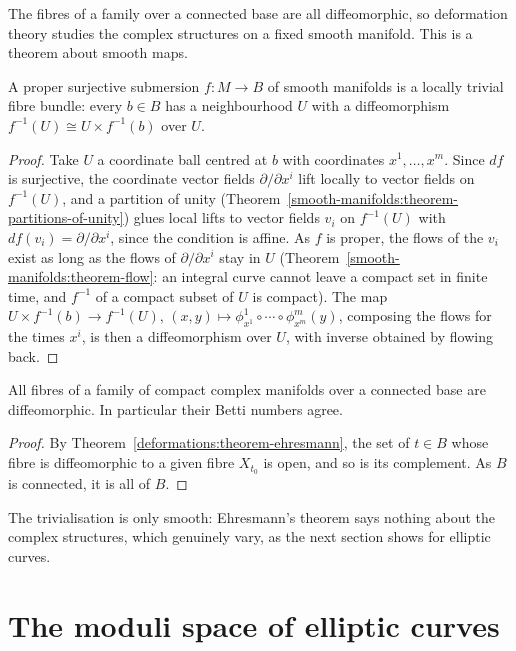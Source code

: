 The fibres of a family over a connected base are all diffeomorphic, so deformation theory studies the complex structures on a fixed smooth manifold. This is a theorem about smooth maps.

\begin{theorem}[Ehresmann]\label{deformations:theorem-ehresmann}
A proper surjective submersion $f \colon M \to B$ of smooth manifolds is a locally trivial fibre bundle: every $b \in B$ has a neighbourhood $U$ with a diffeomorphism
$f^{-1}(U) \cong U \times f^{-1}(b)$ over $U$.
\end{theorem}

\begin{proof}
Take $U$ a coordinate ball centred at $b$ with coordinates $x^1, \ldots, x^m$. Since $df$ is surjective, the coordinate vector fields $\partial/\partial x^i$ lift locally to vector fields on
$f^{-1}(U)$, and a partition of unity (Theorem~\ref{smooth-manifolds:theorem-partitions-of-unity}) glues local lifts to vector fields $v_i$ on $f^{-1}(U)$ with $df(v_i) = \partial/\partial x^i$,
since the condition is affine. As $f$ is proper, the flows of the $v_i$ exist as long as the flows of $\partial/\partial x^i$ stay in $U$
(Theorem~\ref{smooth-manifolds:theorem-flow}: an integral curve cannot leave a compact set in finite time, and $f^{-1}$ of a compact subset of $U$ is compact). The map
$U \times f^{-1}(b) \to f^{-1}(U)$, $(x, y) \mapsto \phi^1_{x^1} \circ \cdots \circ \phi^m_{x^m}(y)$, composing the flows for the times $x^i$, is then a diffeomorphism over $U$, with inverse obtained by
flowing back.
\end{proof}

\begin{corollary}\label{deformations:corollary-fibres-diffeomorphic}
All fibres of a family of compact complex manifolds over a connected base are diffeomorphic. In particular their Betti numbers agree.
\end{corollary}

\begin{proof}
By Theorem~\ref{deformations:theorem-ehresmann}, the set of $t \in B$ whose fibre is diffeomorphic to a given fibre $X_{t_0}$ is open, and so is its complement. As $B$ is connected, it is all of $B$.
\end{proof}

The trivialisation is only smooth: Ehresmann's theorem says nothing about the complex structures, which genuinely vary, as the next section shows for elliptic curves.

\section{The moduli space of elliptic curves}\label{deformations:section-elliptic}


